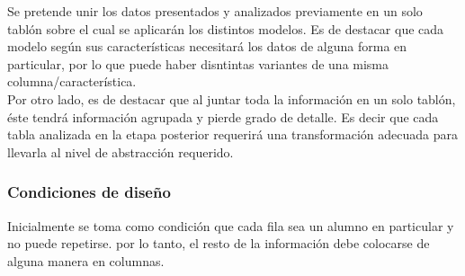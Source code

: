 Se pretende unir los datos presentados y analizados previamente en un solo tablón sobre el cual se aplicarán los distintos modelos. Es de destacar que cada modelo según sus características necesitará los datos de alguna forma en particular, por lo que puede haber disntintas variantes de una misma columna/característica. \\
Por otro lado, es de destacar que al juntar toda la información en un solo tablón, éste tendrá información agrupada y pierde grado de detalle. Es decir que cada tabla analizada en la etapa posterior requerirá una transformación adecuada para llevarla al nivel de abstracción requerido.\\
\subsubsection{Condiciones de diseño}
Inicialmente se toma como condición que cada fila sea un alumno en particular y no puede repetirse. por lo tanto, el resto de la información debe colocarse de alguna manera en columnas.